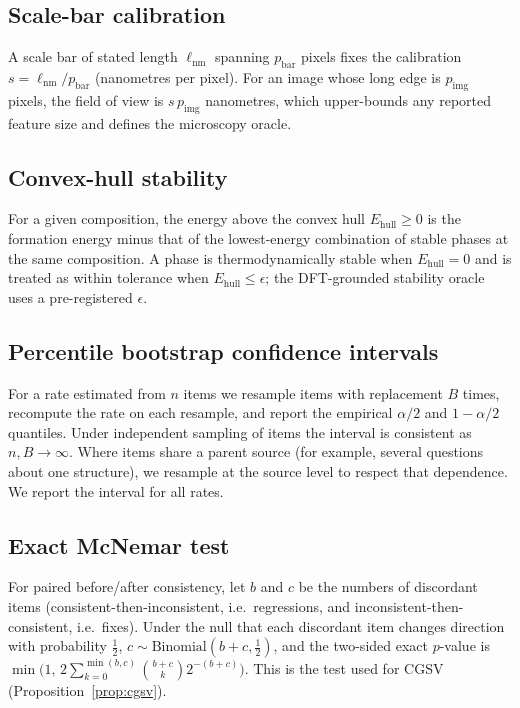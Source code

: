 \documentclass[pdflatex,sn-nature]{sn-jnl}
\begin{document}
\subsection{Scale-bar calibration}
A scale bar of stated length $\ell_{\mathrm{nm}}$ spanning $p_{\mathrm{bar}}$ pixels
fixes the calibration $s=\ell_{\mathrm{nm}}/p_{\mathrm{bar}}$ (nanometres per pixel).
For an image whose long edge is $p_{\mathrm{img}}$ pixels, the field of view is
$s\,p_{\mathrm{img}}$ nanometres, which upper-bounds any reported feature size and
defines the microscopy oracle.

\subsection{Convex-hull stability}
For a given composition, the energy above the convex hull $E_{\mathrm{hull}}\ge0$ is the
formation energy minus that of the lowest-energy combination of stable phases at the
same composition. A phase is thermodynamically stable when $E_{\mathrm{hull}}=0$ and is
treated as within tolerance when $E_{\mathrm{hull}}\le\epsilon$; the DFT-grounded
stability oracle uses a pre-registered $\epsilon$.

\subsection{Percentile bootstrap confidence intervals}
For a rate estimated from $n$ items we resample items with replacement $B$ times,
recompute the rate on each resample, and report the empirical $\alpha/2$ and
$1-\alpha/2$ quantiles. Under independent sampling of items the interval is consistent
as $n,B\to\infty$. Where items share a parent source (for example, several questions
about one structure), we resample at the source level to respect that dependence. We
report the interval for all rates.

\subsection{Exact McNemar test}
For paired before/after consistency, let $b$ and $c$ be the numbers of discordant items
(consistent-then-inconsistent, i.e.\ regressions, and inconsistent-then-consistent,
i.e.\ fixes). Under the null that each discordant item changes direction with
probability $\tfrac12$, $c\sim\mathrm{Binomial}(b+c,\tfrac12)$, and the two-sided exact
$p$-value is $\min\!\big(1,\,2\sum_{k=0}^{\min(b,c)}\binom{b+c}{k}2^{-(b+c)}\big)$. This
is the test used for CGSV (Proposition~\ref{prop:cgsv}).



\end{document}
